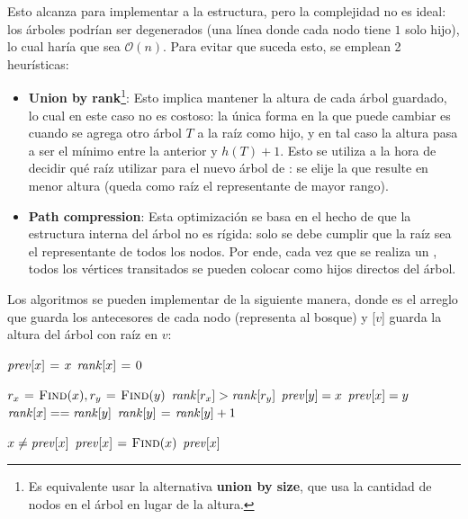 \documentclass[a4paper]{report}
\newcommand{\BigO}[1]{\ensuremath{\mathcal{O}(#1)}}
\begin{document}
Esto alcanza para implementar a la estructura, pero la complejidad no es ideal: los árboles podrían ser degenerados (una línea donde cada nodo tiene $1$ solo hijo), lo cual haría que  sea \BigO{n}. Para evitar que suceda esto, se emplean 2 heurísticas:
\begin{itemize}
    \item \textbf{Union by rank}\footnote{Es equivalente usar la alternativa \textbf{union by size}, que usa la cantidad de nodos en el árbol en lugar de la altura.}: Esto implica mantener la altura de cada árbol guardado, lo cual en este caso no es costoso: la única forma en la que puede cambiar es cuando se agrega otro árbol $T$ a la raíz como hijo, y en tal caso la altura pasa a ser el mínimo entre la anterior y $h(T) + 1$. Esto se utiliza a la hora de decidir qué raíz utilizar para el nuevo árbol de : se elije la que resulte en menor altura (queda como raíz el representante de mayor rango).
    \item \textbf{Path compression}: Esta optimización se basa en el hecho de que la estructura interna del árbol no es rígida: solo se debe cumplir que la raíz sea el representante de todos los nodos. Por ende, cada vez que se realiza un , todos los vértices transitados se pueden colocar como hijos directos del árbol.
\end{itemize}

Los algoritmos se pueden implementar de la siguiente manera, donde  es el arreglo que guarda los antecesores de cada nodo (representa al bosque) y [$v$] guarda la altura del árbol con raíz en $v$:
\begin{codebox}
    \li $\id{prev}[x] \gets x$
    \li $\id{rank}[x] \gets 0$
\end{codebox}
\begin{codebox}
    \li $r_x \mathrel{\hspace{1pt}=\hspace{1pt}} \textnormal{\scshape Find}(x), r_y \mathrel{\hspace{1pt}=\hspace{1pt}} \textnormal{\scshape Find}(y)$
    \li \If $\id{rank}[r_x] > \id{rank}[r_y]$ \Then
    \li $\id{prev}[y] = x$
    \li \Else
    \li $\id{prev}[x] = y$
    \li \If $\id{rank}[x] == \id{rank}[y]$ \Then
    \li $\id{rank}[y] \gets \id{rank}[y] + 1$
    \End
    \End
\end{codebox}
\begin{codebox}
    \li \If $x \neq \id{prev}[x]$ \Then
    \li $\id{prev}[x] \gets \proc{Find}(x)$
    \End
    \li \Return $\id{prev}[x]$
\end{codebox}
\end{document}
